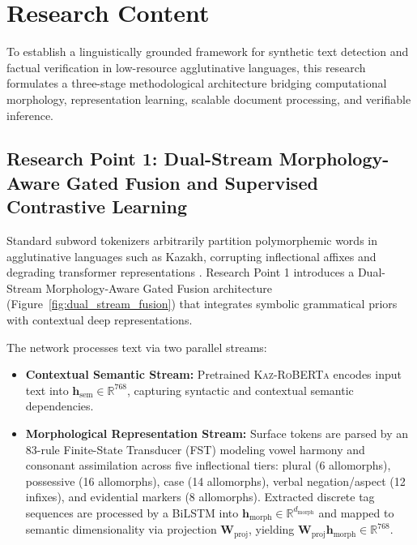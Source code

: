 \section{Research Content}
\label{sec:research_content}

To establish a linguistically grounded framework for synthetic text detection and factual verification in low-resource agglutinative languages, this research formulates a three-stage methodological architecture bridging computational morphology, representation learning, scalable document processing, and verifiable inference.

\subsection{Research Point 1: Dual-Stream Morphology-Aware Gated Fusion and Supervised Contrastive Learning}
\label{sec:research_point_1}

Standard subword tokenizers arbitrarily partition polymorphemic words in agglutinative languages such as Kazakh, corrupting inflectional affixes and degrading transformer representations \cite{khurana2024subwords}. Research Point 1 introduces a Dual-Stream Morphology-Aware Gated Fusion architecture (Figure~\ref{fig:dual_stream_fusion}) that integrates symbolic grammatical priors with contextual deep representations.

The network processes text via two parallel streams:
\begin{itemize}[leftmargin=*, nosep]
    \item \textbf{Contextual Semantic Stream:} Pretrained \textsc{Kaz-RoBERTa} \cite{sagyndyk2025kazroberta} encodes input text into $\mathbf{h}_{\text{sem}} \in \mathbb{R}^{768}$, capturing syntactic and contextual semantic dependencies.
    \item \textbf{Morphological Representation Stream:} Surface tokens are parsed by an 83-rule Finite-State Transducer (FST) \cite{khoshhal2020kazakh, tyers2012free} modeling vowel harmony and consonant assimilation across five inflectional tiers: plural (6 allomorphs), possessive (16 allomorphs), case (14 allomorphs), verbal negation/aspect (12 infixes), and evidential markers (8 allomorphs). Extracted discrete tag sequences are processed by a BiLSTM into $\mathbf{h}_{\text{morph}} \in \mathbb{R}^{d_{\text{morph}}}$ and mapped to semantic dimensionality via projection $\mathbf{W}_{\text{proj}}$, yielding $\mathbf{W}_{\text{proj}} \mathbf{h}_{\text{morph}} \in \mathbb{R}^{768}$.
\end{itemize}

